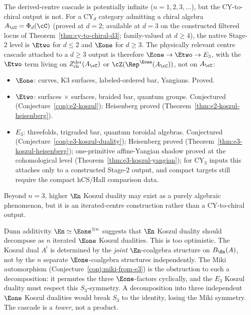 \begin{remark}
\label{rem:cascade-terminates}
The derived-centre cascade is potentially infinite
($n = 1, 2, 3, \ldots$), but the CY-to-chiral output is not. For a
CY$_d$ category admitting a chiral algebra \(A_\cC=\Phi_d(\cC)\)
(proved at $d = 2$; available at $d = 3$ on the constructed filtered
locus of Theorem~\ref{thm:cy-to-chiral-d3}; family-valued
at $d \geq 4$), the native Stage-2 level is \(\Etwo\) for \(d\leq2\)
and \(\Eone\) for \(d\geq3\). The physically relevant centre cascade
attached to a \(d\geq3\) output is therefore
\(\Eone \to \Etwo \to E_3\), with the \(\Etwo\) term living on
\(Z^{\mathrm{der}}_{\mathrm{ch}}(A_\cC)\) or
\(\cZ(\Rep^{\Eone}(A_\cC))\), not on \(A_\cC\):
\begin{itemize}
 \item $\Eone$: curves, K3 surfaces, labeled-ordered bar, Yangians. Proved.
 \item $\Etwo$: surfaces $\times$ surfaces, braided bar, quantum groups. Conjectured (Conjecture~\ref{conj:e2-koszul}); Heisenberg proved (Theorem~\ref{thm:e2-koszul-heisenberg}).
 \item $E_3$: threefolds, trigraded bar, quantum toroidal algebras. Conjectured (Conjecture~\ref{conj:e3-koszul-duality}); Heisenberg proved (Theorem~\ref{thm:e3-koszul-heisenberg}); one-primitive affine-Yangian shadow proved at the cohomological level (Theorem~\ref{thm:e3-koszul-yangian}); for CY$_3$ inputs this attaches only to a constructed Stage-$2$ output, and compact targets still require the compact hCS/Hall comparison data.
\end{itemize}
Beyond $n = 3$, higher $\En$ Koszul duality may exist as a purely
algebraic phenomenon, but it is an iterated-centre construction rather
than a CY-to-chiral output.
\end{remark}

\begin{remark}
\label{rem:cascade-dunn}
Dunn additivity $\En \simeq \Eone^{\otimes n}$ suggests that $\En$ Koszul duality should decompose as $n$ iterated $\Eone$ Koszul dualities. This is too optimistic. The Koszul dual $A^!$ is determined by the \emph{joint} $\En$-coalgebra structure on $B_{\En}(A)$, not by the $n$ separate $\Eone$-coalgebra structures independently. The Miki automorphism (Conjecture~\ref{conj:miki-from-e3}) is the obstruction to such a decomposition: it permutes the three $\Eone$-factors cyclically, and the $E_3$ Koszul duality must respect this $S_3$-symmetry. A decomposition into three independent $\Eone$ Koszul dualities would break $S_3$ to the identity, losing the Miki symmetry. The cascade is a \emph{tower}, not a product.
\end{remark}

